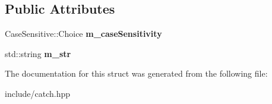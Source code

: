 \subsection*{Public Attributes}
\begin{DoxyCompactItemize}
\item 
Case\+Sensitive\+::\+Choice {\bfseries m\+\_\+case\+Sensitivity}\hypertarget{structCatch_1_1Matchers_1_1StdString_1_1CasedString_ae1c2864c986941536a6e94cca0528f92}{}\label{structCatch_1_1Matchers_1_1StdString_1_1CasedString_ae1c2864c986941536a6e94cca0528f92}

\item 
std\+::string {\bfseries m\+\_\+str}\hypertarget{structCatch_1_1Matchers_1_1StdString_1_1CasedString_ad05dbc99aba3c3c386d6b856b213f911}{}\label{structCatch_1_1Matchers_1_1StdString_1_1CasedString_ad05dbc99aba3c3c386d6b856b213f911}

\end{DoxyCompactItemize}


The documentation for this struct was generated from the following file\+:\begin{DoxyCompactItemize}
\item 
include/catch.\+hpp\end{DoxyCompactItemize}
